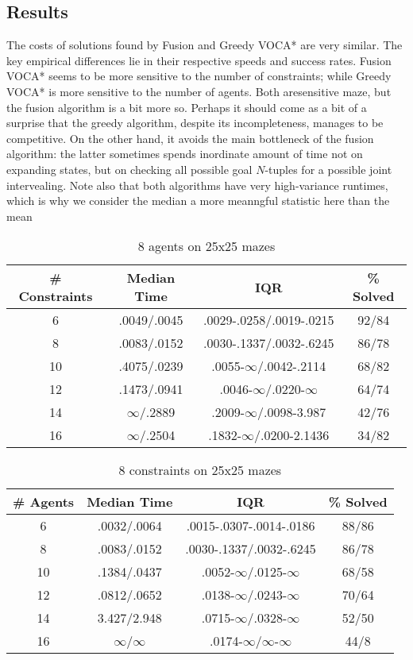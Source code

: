 \documentclass[letterpaper]{article}
\begin{document}
\subsection{Results}

The costs of solutions found by Fusion and Greedy VOCA* are very similar. The key empirical differences lie in their respective speeds and success rates. Fusion VOCA* seems to be more sensitive to the number of constraints; while Greedy VOCA* is more sensitive to the number of agents. Both aresensitive maze, but the fusion algorithm is a bit more so. Perhaps it should come as a bit of a surprise that the greedy algorithm, despite its incompleteness, manages to be competitive. On the other hand, it avoids the main bottleneck of the fusion algorithm: the latter sometimes spends inordinate amount of time not on expanding states, but on checking all possible goal $N$-tuples for a possible joint intervealing. Note also that both algorithms have very high-variance runtimes, which is why we consider the median a more meanngful statistic here than the mean

\begin{table}
\centering
\begin{tabular} {|c|c|c|c|} \hline
\# Constraints & Median Time & IQR & \% Solved \\ \hline
6 & .0049/.0045 & .0029-.0258/.0019-.0215 & 92/84 \\ \hline
8 & .0083/.0152 & .0030-.1337/.0032-.6245 & 86/78 \\ \hline
10 & .4075/.0239 & .0055-$\infty$/.0042-.2114 & 68/82 \\ \hline
12 & .1473/.0941 & .0046-$\infty$/.0220-$\infty$ & 64/74 \\ \hline
14 & $\infty$/.2889 & .2009-$\infty$/.0098-3.987 & 42/76 \\ \hline
16 &  $\infty$/.2504 & .1832-$\infty$/.0200-2.1436 & 34/82 \\ \hline
\end{tabular}
\caption{8 agents on 25x25 mazes}
\label{tab:doors}
\end{table}

\begin{table}
\centering
\begin{tabular} {|c|c|c|c|} \hline
\# Agents & Median Time & IQR & \% Solved \\ \hline
6 & .0032/.0064 & .0015-.0307-.0014-.0186 & 88/86\\ \hline
8 & .0083/.0152 & .0030-.1337/.0032-.6245 & 86/78 \\ \hline
10 & .1384/.0437 & .0052-$\infty$/.0125-$\infty$ & 68/58 \\ \hline
12 & .0812/.0652 & .0138-$\infty$/.0243-$\infty$ & 70/64 \\ \hline
14 & 3.427/2.948 & .0715-$\infty$/.0328-$\infty$ & 52/50 \\ \hline
16 & $\infty$/$\infty$ & .0174-$\infty$/$\infty$-$\infty$ & 44/8 \\ \hline
\end{tabular}
\caption{8 constraints on 25x25 mazes}
\label{tab:agents}
\end{table}
\end{document}
